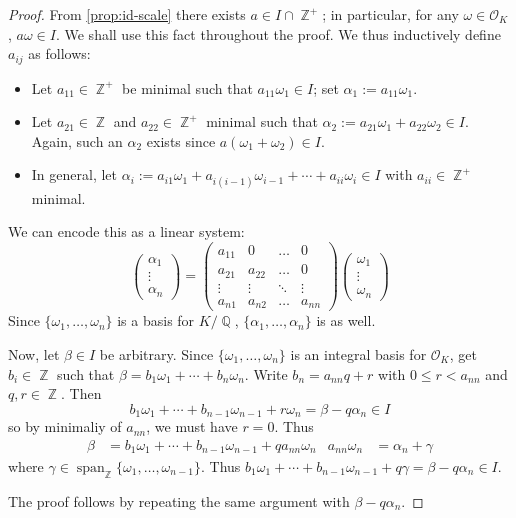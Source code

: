 \documentclass[11pt, a4paper]{memoir}
\DeclareMathOperator{\Q}{{\mathbb{Q}}}
\DeclareMathOperator{\Z}{{\mathbb{Z}}}
\theoremstyle{change}
\theoremstyle{plain}
\theoremstyle{nonumberplain}
\newtheorem{proof}{Proof}
\DeclareMathOperator{\spn}{span}
\numberwithin{equation}{section}
\begin{document}
\begin{proof}
    From \cref{prop:id-scale} there exists $a\in I\cap\Z^+$; in particular, for any $\omega\in\mathcal{O}_K$, $a\omega\in I$.
    We shall use this fact throughout the proof.
    We thus inductively define $a_{ij}$ as follows:
    \begin{itemize}[nl]
        \item Let $a_{11}\in\Z^+$ be minimal such that $a_{11}\omega_1\in I$; set $\alpha_1:=a_{11}\omega_1$.
        \item Let $a_{21}\in\Z$ and $a_{22}\in\Z^+$ minimal such that $\alpha_2:=a_{21}\omega_1+a_{22}\omega_2\in I$.
            Again, such an $\alpha_2$ exists since $a(\omega_1+\omega_2)\in I$.
        \item In general, let $\alpha_i:=a_{i1}\omega_1+a_{i(i-1)}\omega_{i-1}+\cdots+a_{ii}\omega_i\in I$ with $a_{ii}\in\Z^+$ minimal.
    \end{itemize}
    We can encode this as a linear system:
    \begin{equation*}
        \begin{pmatrix}\alpha_1\\\vdots\\\alpha_n\end{pmatrix} = \begin{pmatrix}a_{11}&0&\hdots&0\\a_{21}&a_{22}&\hdots&0\\\vdots&\vdots&\ddots&\vdots\\a_{n1}&a_{n2}&\hdots&a_{nn}\end{pmatrix}
        \begin{pmatrix}\omega_1\\\vdots\\\omega_n\end{pmatrix}
    \end{equation*}
    Since $\{\omega_1,\ldots,\omega_n\}$ is a basis for $K/\Q$, $\{\alpha_1,\ldots,\alpha_n\}$ is as well.

    Now, let $\beta\in I$ be arbitrary.
    Since $\{\omega_1,\ldots,\omega_n\}$ is an integral basis for $\mathcal{O}_K$, get $b_i\in\Z$ such that $\beta=b_1\omega_1+\cdots+b_n\omega_n$.
    Write $b_n=a_{nn}q+r$ with $0\leq r<a_{nn}$ and $q,r\in\Z$.
    Then
    \begin{equation*}
        b_1\omega_1+\cdots+b_{n-1}\omega_{n-1}+r\omega_n=\beta-q\alpha_n\in I
    \end{equation*}
    so by minimaliy of $a_{nn}$, we must have $r=0$.
    Thus
    \begin{align*}
        \beta&=b_1\omega_1+\cdots+b_{n-1}\omega_{n-1}+qa_{nn}\omega_n & a_{nn}\omega_n&=\alpha_n+\gamma
    \end{align*}
    where $\gamma\in\spn_{\Z}\{\omega_1,\ldots,\omega_{n-1}\}$.
    Thus $b_1\omega_1+\cdots+b_{n-1}\omega_{n-1}+q\gamma=\beta-q\alpha_n\in I$.

    The proof follows by repeating the same argument with $\beta-q\alpha_n$.
\end{proof}
\end{document}

